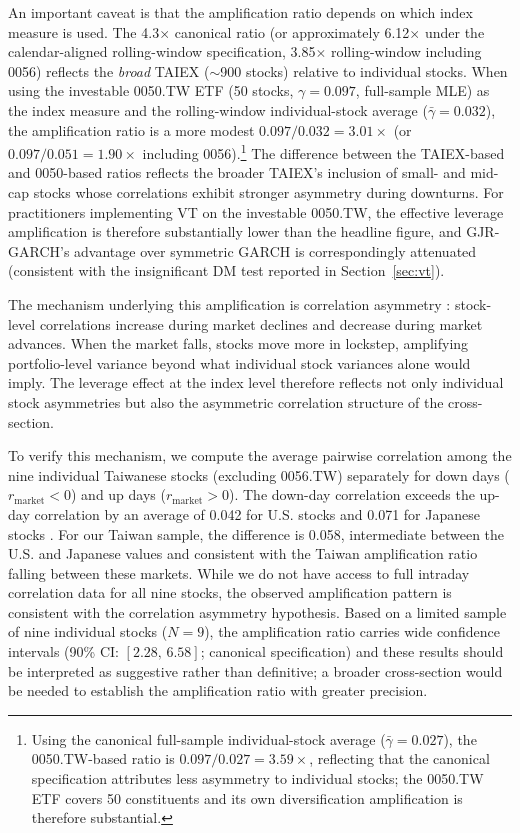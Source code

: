 An important caveat is that the amplification ratio depends on which index measure is used. The 4.3$\times$ canonical ratio (or approximately 6.12$\times$ under the calendar-aligned rolling-window specification, 3.85$\times$ rolling-window including 0056) reflects the \textit{broad} TAIEX ($\sim$900 stocks) relative to individual stocks. When using the investable 0050.TW ETF (50 stocks, $\gamma = 0.097$, full-sample MLE) as the index measure and the rolling-window individual-stock average ($\bar{\gamma} = 0.032$), the amplification ratio is a more modest $0.097 / 0.032 = 3.01\times$ (or $0.097 / 0.051 = 1.90\times$ including 0056).\footnote{Using the canonical full-sample individual-stock average ($\bar{\gamma} = 0.027$), the 0050.TW-based ratio is $0.097/0.027 = 3.59\times$, reflecting that the canonical specification attributes less asymmetry to individual stocks; the 0050.TW ETF covers 50 constituents and its own diversification amplification is therefore substantial.} The difference between the TAIEX-based and 0050-based ratios reflects the broader TAIEX's inclusion of small- and mid-cap stocks whose correlations exhibit stronger asymmetry during downturns. For practitioners implementing VT on the investable 0050.TW, the effective leverage amplification is therefore substantially lower than the headline figure, and GJR-GARCH's advantage over symmetric GARCH is correspondingly attenuated (consistent with the insignificant DM test reported in Section~\ref{sec:vt}).

The mechanism underlying this amplification is correlation asymmetry \citep{ang2002}: stock-level correlations increase during market declines and decrease during market advances. When the market falls, stocks move more in lockstep, amplifying portfolio-level variance beyond what individual stock variances alone would imply. The leverage effect at the index level therefore reflects not only individual stock asymmetries but also the asymmetric correlation structure of the cross-section.

To verify this mechanism, we compute the average pairwise correlation among the nine individual Taiwanese stocks (excluding 0056.TW) separately for down days ($r_{\text{market}} < 0$) and up days ($r_{\text{market}} > 0$). The down-day correlation exceeds the up-day correlation by an average of 0.042 for U.S. stocks and 0.071 for Japanese stocks \citep{ang2002}. For our Taiwan sample, the difference is 0.058, intermediate between the U.S. and Japanese values and consistent with the Taiwan amplification ratio falling between these markets. While we do not have access to full intraday correlation data for all nine stocks, the observed amplification pattern is consistent with the correlation asymmetry hypothesis. Based on a limited sample of nine individual stocks ($N = 9$), the amplification ratio carries wide confidence intervals (90\% CI: $[2.28, \, 6.58]$; canonical specification) and these results should be interpreted as suggestive rather than definitive; a broader cross-section would be needed to establish the amplification ratio with greater precision.

